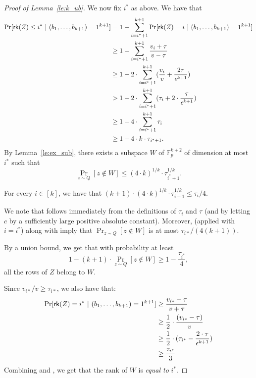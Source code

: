 \begin{proof}[Proof of Lemma~\ref{le:k_ub}]
We now fix $i^*$ as above. We have that
\begin{align*}
\Pr[\mathsf{rk}(Z) \le i^* ~ | ~ (b_1,\dots,b_{k+1})=1^{k+1}] &= 1 - \displaystyle\sum\limits_{i = i^*+1}^{k+1} \Pr[\mathsf{rk}(Z) = i ~ | ~ (b_1,\dots,b_{k+1})=1^{k+1}]\\
&\geq 1 - \displaystyle\sum\limits_{i = i^*+1}^{k+1} \frac{v_i + \tau}{v-\tau}\\
&\geq 1 - 2 \cdot \displaystyle\sum\limits_{i = i^*+1}^{k+1} (\frac{v_i}{v}  + \frac{2\tau}{\epsilon^{k+1}})\\
&> 1 - 2 \cdot \displaystyle\sum\limits_{i = i^*+1}^{k+1} (\tau_i + 2 \cdot \frac{\tau}{\epsilon^{k+1}})\\
& \geq 1 - 4 \cdot \displaystyle\sum\limits_{i = i^*+1}^{k+1} \tau_i\\
&\geq 1 - 4 \cdot k\cdot \tau_{i^*+1}.
\end{align*}
By Lemma~\ref{le:ex_sub}, there exists a subspace $W$ of $\mathbb{F}_p^{k+2}$ of dimension at most $i^*$ such that
\begin{equation}\label{eq:notin_W}
\Pr_{z \sim Q}[z \notin W] \le (4 \cdot k)^{1/k} \cdot \tau_{i^*+1}^{1/k}.
\end{equation}

\begin{proposition}\label{prop:failure}
	For every $i \in [k]$, we have that $(k+1) \cdot (4 \cdot k)^{1/k} \cdot \tau_{i+1}^{1/k} \le \tau_{i }/4$.
\end{proposition}
We note that  follows immediately from the definitions of $\tau_{i}$ and $\tau$ (and by letting $c$ by a sufficiently large positive absolute constant). Moreover,  (applied with $i = i^*$) along with  imply that $\Pr_{z \sim Q}[z \notin W]$ is at most $\tau_{i*}/(4(k+1))$.

By a union bound, we get that with probability at least
\begin{equation}\label{eq:alg_succ_prob}
1- (k+1) \cdot \Pr_{z \sim Q}[z \notin W] \geq 1 - \frac{\tau_{i^*}}{4},
\end{equation}
all the rows of $Z$ belong to $W$.

Since $v_{i*}/v \geq \tau_{i*}$, we also have that:
\begin{align}\label{eq:cond_lb_i_star}
\Pr[\mathsf{rk}(Z) = i^* ~ | ~ (b_1,\dots,b_{k+1})=1^{k+1}] &\geq \frac{v_{i*}-\tau}{v + \tau}\nonumber\\
&\geq \frac{1}{2} \cdot \frac{(v_{i*}-\tau)}{v}\nonumber\\
&\geq \frac{1}{2} \cdot (\tau_{i^*} - \frac{2 \cdot \tau}{\epsilon^{k+1}})\nonumber\\
& \geq \frac{\tau_{i^*}}{3}
\end{align}
Combining  and , we get that the rank of $W$ is \emph{equal to} $i^*$.


\end{proof}
